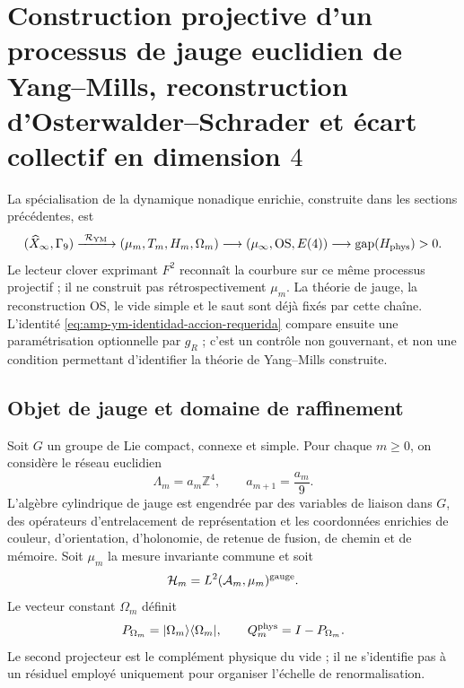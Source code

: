 \section[Processus de jauge euclidien de Yang--Mills en dimension 4]{Construction
projective d’un processus de jauge euclidien de Yang--Mills, reconstruction
d’Osterwalder--Schrader et écart collectif en dimension \(4\)}


\noindent La spécialisation de la dynamique nonadique enrichie,
construite dans les sections précédentes, est
\[
 (\widehat X_\infty,\Gamma_9)
 \xrightarrow{\ \mathcal R_{\rm YM}\ }
 (\mu_m,T_m,H_m,\Omega_m)
 \longrightarrow(\mu_\infty,\mathrm{OS},E(4))
 \longrightarrow\operatorname{gap}(H_{\rm phys})>0.
\]
Le lecteur clover exprimant \(F^2\) reconnaît la courbure sur ce même processus projectif ; il ne construit pas rétrospectivement \(\mu_m\). La théorie de jauge, la reconstruction OS, le vide simple et le saut sont déjà fixés par cette chaîne. L'identité \eqref{eq:amp-ym-identidad-accion-requerida} compare ensuite une paramétrisation optionnelle par \(g_R\) ; c'est un contrôle non gouvernant, et non une condition permettant d'identifier la théorie de Yang--Mills construite.

\subsection*{Objet de jauge et domaine de raffinement}

Soit \(G\) un groupe de Lie compact, connexe et simple. Pour chaque
\(m\geq0\), on considère le réseau euclidien
\begin{equation}\label{eq:realizaciones-ym-red}
 \Lambda_m=a_m\mathbb Z^4,
 \qquad a_{m+1}=\frac{a_m}{9}.
\end{equation}
L'algèbre cylindrique de jauge est engendrée par des variables de liaison dans \(G\), des opérateurs d'entrelacement de représentation et les coordonnées enrichies de couleur, d'orientation, d'holonomie, de retenue de fusion, de chemin et de mémoire. Soit \(\mu_m\) la mesure invariante commune et soit
\[
 \mathcal H_m=L^2(\mathcal A_m,\mu_m)^{\rm gauge}.
\]
Le vecteur constant \(\Omega_m\) définit
\begin{equation}\label{eq:realizaciones-ym-proyectores}
 P_{\Omega_m}=|\Omega_m\rangle\langle\Omega_m|,
 \qquad Q_m^{\rm phys}=I-P_{\Omega_m}.
\end{equation}
Le second projecteur est le complément physique du vide ; il ne s’identifie pas
à un résiduel employé uniquement pour organiser l’échelle de
renormalisation.

